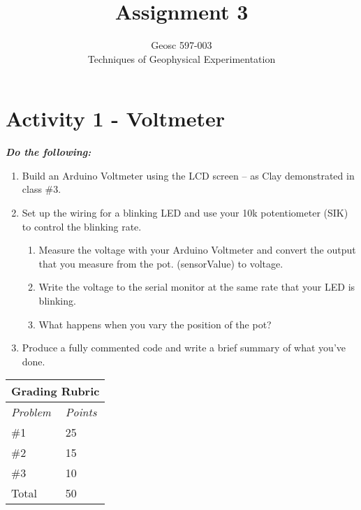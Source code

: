 \documentclass[10pt]{article}
\begin{document}

\title{Assignment 3}%
\author{Geosc 597-003\\
Techniques of Geophysical Experimentation} %

\maketitle




\section*{Activity 1 - Voltmeter}

\noindent\textbf{\textit{Do the following:}}
\begin{enumerate}
		\item Build an Arduino Voltmeter using the LCD screen -- as Clay demonstrated in class \#3.
		\item Set up the wiring for a blinking LED and use your 10k potentiometer (SIK) to control the blinking rate. 
		\begin{enumerate}
			\item Measure the voltage with your Arduino Voltmeter and convert the output that you measure from the pot. (sensorValue) to voltage.
			\item Write the voltage to the serial monitor at the same rate that your LED is blinking.
			\item What happens when you vary the position of the pot?
		\end{enumerate} 
		\item Produce a fully commented code and write a brief summary of what you’ve done.
\end{enumerate}

\begin{table}[h!]
	\footnotesize
	\centering
	\begin{tabular}{@{}ll@{}}
		\multicolumn{2}{c}{\textbf{Grading Rubric}} \\ \midrule 
		\multicolumn{1}{l}{\textit{Problem}}   & \textit{Points}   \\ \midrule 
		\#1                    & 25       \\ \midrule
		\#2            & 15       \\ \midrule
		\#3            & 10       \\ \midrule
		Total                            & 50       \\ \bottomrule
	\end{tabular}
\end{table}
\end{document}
